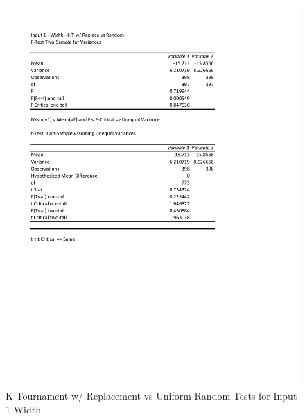 \documentclass[times]{article}
\begin{document}
	\begin{figure}
		\caption{K-Tournament w/ Replacement vs Uniform Random Tests for Input 1 Width}
		\label{fig:1parent2_moea}
		\includegraphics[width=\textwidth]{./t_test/1_parent2_moea.pdf}
	\end{figure}
\end{document}
